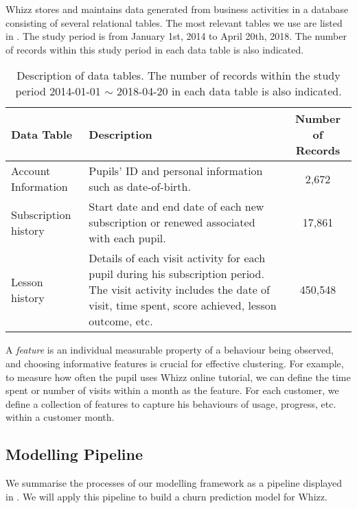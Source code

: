 \documentclass[english,a4,oneside,9pt]{extarticle}
\begin{document}
Whizz stores and maintains data generated from business activities in a database consisting of several relational tables. The most relevant tables we use are listed in . The study period is from January 1st, 2014 to April 20th, 2018. The number of records within this study period in each data table is also indicated.

\begin{table}[!h]
\centering
\footnotesize
\begin{tabular}{l|p{6cm}|c}
\hline
\textbf{Data Table} & \textbf{Description} & \textbf{Number of Records} \\
\hline
Account Information &
Pupils' ID and personal information such as date-of-birth. &
2,672 \\
\hline
Subscription history &
Start date and end date of each new subscription or renewed associated with each pupil. &
17,861 \\
\hline
Lesson history &
Details of each visit activity for each pupil during his subscription period. The visit activity includes the date of visit, time spent, score achieved, lesson outcome, etc. &
450,548 \\
\hline
\end{tabular}
\caption{Description of data tables. The number of records within the study period 2014-01-01 $\sim$ 2018-04-20 in each data table is also indicated.}
\label{tab:dataTable}
\end{table}

A \textit{feature} is an individual measurable property of a behaviour being observed, and choosing informative features is crucial for effective clustering. For example, to measure how often the pupil uses Whizz online tutorial, we can define the time spent or number of visits within a month as the feature. For each customer, we define a collection of features to capture his behaviours of usage, progress, etc. within a customer month.

\subsection*{Modelling Pipeline}

We summarise the processes of our modelling framework as a pipeline displayed in . We will apply this pipeline to build a churn prediction model for Whizz.

\begin{figure}[htb]
\centering
\end{figure}
\end{document}
